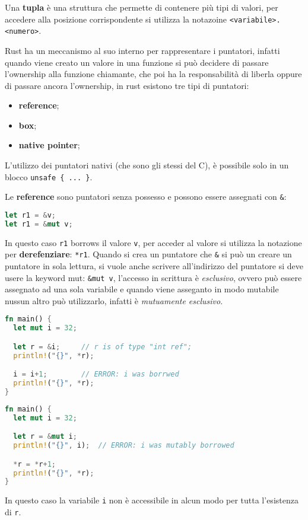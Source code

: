 \documentclass[12pt]{article}
\begin{document}
\hfill

Una \textbf{tupla} \`e una struttura che permette di contenere pi\`u tipi di valori, per accedere alla posizione corrispondente si utilizza la notazoine \texttt{<variabile>.<numero>}.

\hfill

Rust ha un meccanismo al suo interno per rappresentare i puntatori, infatti quando viene creato un valore in una funzione si pu\`o decidere di passare l'ownership alla funzione chiamante, che poi ha la responsabilit\`a di liberla oppure di passare ancora l'ownership, in rust esistono tre tipi di puntatori:
\begin{itemize}
  \item \textbf{reference};
  \item \textbf{box};
  \item \textbf{native pointer};
\end{itemize}
L'utilizzo dei puntatori nativi (che sono gli stessi del C), \`e possibile solo in un blocco \verb|unsafe { ... }|.

Le \textbf{reference} sono puntatori senza possesso e possono essere assegnati con \texttt{\&}:
\begin{lstlisting}[language=rust]
let r1 = &v;
let r1 = &mut v;
\end{lstlisting}
In questo caso \texttt{r1} borrows il valore \texttt{v}, per acceder al valore si utilizza la notazione per \textbf{derefenziare}: \texttt{*r1}. Quando si crea un puntatore che \texttt{\&} si pu\`o un creare un puntatore in sola lettura, si vuole anche scrivere all'indirizzo del puntatore si deve usere la keyword mut: \texttt{\&mut v}, l'accesso in scrittura \`e \emph{esclusivo}, ovvero pu\`o essere assegnato ad una sola variabile e quando viene asseganto in modo mutabile nussun altro pu\`o utilizzarlo, infatti \`e \emph{mutuamente esclusivo}.
\begin{lstlisting}[language=rust]
fn main() {
  let mut i = 32;

  let r = &i;     // r is of type "int ref";
  println!("{}", *r);

  i = i+1;        // ERROR: i was borrwed
  println!("{}", *r);
}
\end{lstlisting}
\begin{lstlisting}[language=rust]
fn main() {
  let mut i = 32;

  let r = &mut i;
  println!("{}", i);  // ERROR: i was mutably borrowed

  *r = *r+1;
  println!("{}", *r);
}
\end{lstlisting}
In questo caso la variabile \texttt{i} non \`e accessibile in alcun modo per tutta l'esistenza di \texttt{r}.
\end{document}
